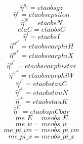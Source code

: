 \begin{dmath}
{\hat{\eta}^{g_z}}={etaobsgz}
\end{dmath}
\begin{dmath}
{\hat{\eta}^{\varepsilon}}={etaobsepsilon}
\end{dmath}
\begin{dmath}
{\hat{\eta}^{N}}={etaobsN}
\end{dmath}
\begin{dmath}
{etaC}={etaobsC}
\end{dmath}
\begin{dmath}
{\hat{\eta}^{i}}={etaobsI}
\end{dmath}
\begin{dmath}
{\hat{\eta}^{\phi^H}}={etaobsvarphiH}
\end{dmath}
\begin{dmath}
{\hat{\eta}^{\phi^X}}={etaobsvarphiX}
\end{dmath}
\begin{dmath}
{\hat{\eta}^{\phi^*}}={etaobsvarphistar}
\end{dmath}
\begin{dmath}
{\hat{\eta}^{\phi^W}}={etaobsvarphiW}
\end{dmath}
\begin{dmath}
{\hat{\eta}^{\tau^c}}={etaobstauC}
\end{dmath}
\begin{dmath}
{\hat{\eta}^{\tau^w}}={etaobstauN}
\end{dmath}
\begin{dmath}
{\hat{\eta}^{\tau^k}}={etaobstauK}
\end{dmath}
\begin{dmath}
{\hat{\bar{\eta}}^C}={etaobspiCbar}
\end{dmath}
\begin{dmath}
{me\_E}={meobs\_E}
\end{dmath}
\begin{dmath}
{me\_w}={meobs\_w}
\end{dmath}
\begin{dmath}
{me\_pi\_im}={meobs\_pi\_im}
\end{dmath}
\begin{dmath}
{me\_pi\_x}={meobs\_pi\_x}
\end{dmath}
